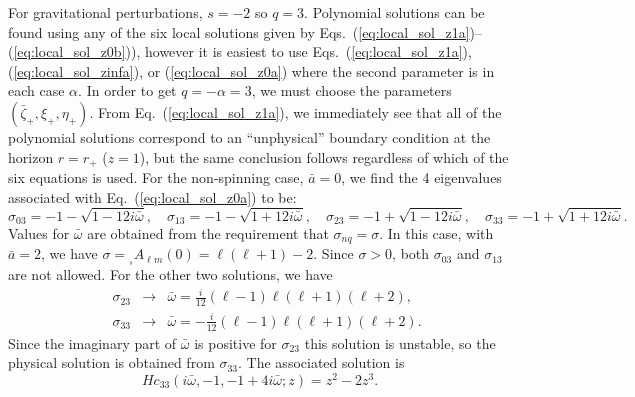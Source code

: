 \documentclass[11pt]{article}
\newcommand{\scA}[4][]{{}_{{}_{#2}}A^{#1}_{#3}(#4)}
\begin{document}
For gravitational perturbations, $s=-2$ so $q=3$.  Polynomial
solutions can be found using any of the six local solutions given by
Eqs.~(\ref{eq:local_sol_z1a})--(\ref{eq:local_sol_z0b})), however it
is easiest to use Eqs.~(\ref{eq:local_sol_z1a}),
(\ref{eq:local_sol_zinfa}), or (\ref{eq:local_sol_z0a}) where the
second parameter is in each case $\alpha$.  In order to get
$q=-\alpha=3$, we must choose the parameters
$(\bar\zeta_+,\xi_+,\eta_+)$.  From Eq.~(\ref{eq:local_sol_z1a}), we
immediately see that all of the polynomial solutions correspond to an
``unphysical'' boundary condition at the horizon $r=r_+$ ($z=1$), but
the same conclusion follows regardless of which of the six equations
is used.  For the non-spinning case, $\bar{a}=0$, we find the 4
eigenvalues associated with Eq.~(\ref{eq:local_sol_z0a}) to be:
\begin{equation}
\sigma_{03}=-1-\sqrt{1-12i\bar\omega},\quad
\sigma_{13}=-1-\sqrt{1+12i\bar\omega},\quad
\sigma_{23}=-1+\sqrt{1-12i\bar\omega},\quad
\sigma_{33}=-1+\sqrt{1+12i\bar\omega}.
\end{equation}
Values for $\bar\omega$ are obtained from the requirement that
$\sigma_{nq}=\sigma$.  In this case, with $\bar{a}=2$, we have
$\sigma=\scA{s}{\ell{m}}{0}=\ell(\ell+1)-2$.  Since $\sigma>0$, both
$\sigma_{03}$ and $\sigma_{13}$ are not allowed.  For the other
two solutions, we have
\begin{eqnarray}
  \quad\sigma_{23}&\to&\bar\omega=\frac{i}{12}(\ell-1)\ell(\ell+1)(\ell+2), \\
  \quad\sigma_{33}&\to&\bar\omega=-\frac{i}{12}(\ell-1)\ell(\ell+1)(\ell+2).
\end{eqnarray}
Since the imaginary part of $\bar\omega$ is positive for
$\sigma_{23}$ this solution is unstable, so the physical solution is
obtained from $\sigma_{33}$.  The associated solution is
\begin{equation}
  Hc_{33}(i\bar\omega,-1,-1+4i\bar\omega;z) = z^2-2z^3.
\end{equation}
\end{document}
